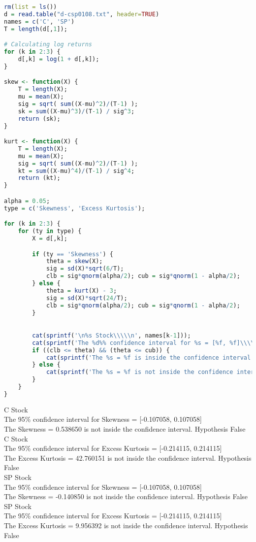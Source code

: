 \documentclass{article}
\begin{document}
\begin{lstlisting}[language=R]
rm(list = ls())
d = read.table("d-csp0108.txt", header=TRUE)
names = c('C', 'SP')
T = length(d[,1]);

# Calculating log returns
for (k in 2:3) {
	d[,k] = log(1 + d[,k]);
}

skew <- function(X) {
	T = length(X);
	mu = mean(X);
	sig = sqrt( sum((X-mu)^2)/(T-1) );
	sk = sum((X-mu)^3)/(T-1) / sig^3;
	return (sk);
}

kurt <- function(X) {
	T = length(X);
	mu = mean(X);
	sig = sqrt( sum((X-mu)^2)/(T-1) );
	kt = sum((X-mu)^4)/(T-1) / sig^4;
	return (kt);
}

alpha = 0.05;
type = c('Skewness', 'Excess Kurtosis');

for (k in 2:3) {
	for (ty in type) {
		X = d[,k];

		if (ty == 'Skewness') {
			theta = skew(X);
			sig = sd(X)*sqrt(6/T);
			clb = sig*qnorm(alpha/2); cub = sig*qnorm(1 - alpha/2);
		} else {
			theta = kurt(X) - 3;
			sig = sd(X)*sqrt(24/T);
			clb = sig*qnorm(alpha/2); cub = sig*qnorm(1 - alpha/2);
		}
		

		cat(sprintf('\n%s Stock\\\\\n', names[k-1]));
		cat(sprintf('The %d%% confidence interval for %s = [%f, %f]\\\\\n', 100*(1-alpha), ty, clb, cub));
		if ((clb <= theta) && (theta <= cub)) {
			cat(sprintf('The %s = %f is inside the confidence interval.\\\\\n\n', ty, theta));
		} else {
			cat(sprintf('The %s = %f is not inside the confidence interval.\\\\\n\n', ty, theta));
		}
	}
}

\end{lstlisting}

C Stock\\
The 95\% confidence interval for Skewness = [-0.107058, 0.107058]\\
The Skewness = 0.538650 is not inside the confidence interval. Hypothesis False\\


C Stock\\
The 95\% confidence interval for Excess Kurtosis = [-0.214115, 0.214115]\\
The Excess Kurtosis = 42.760151 is not inside the confidence interval. Hypothesis False\\


SP Stock\\
The 95\% confidence interval for Skewness = [-0.107058, 0.107058]\\
The Skewness = -0.140850 is not inside the confidence interval. Hypothesis False\\


SP Stock\\
The 95\% confidence interval for Excess Kurtosis = [-0.214115, 0.214115]\\
The Excess Kurtosis = 9.956392 is not inside the confidence interval. Hypothesis False\\
\end{document}
